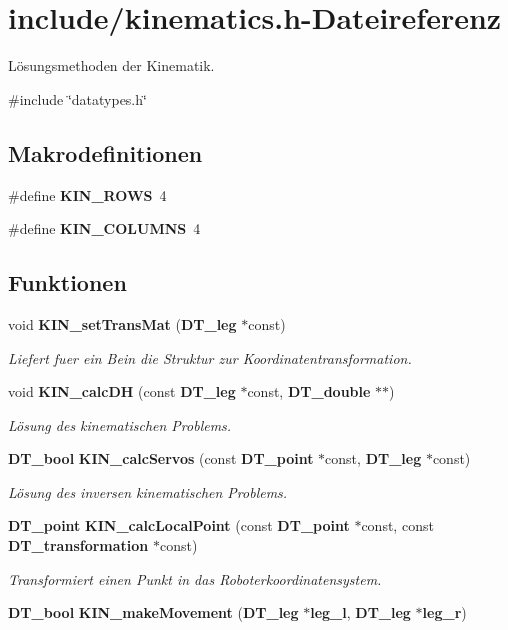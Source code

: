 \section{include/kinematics.h-\/Dateireferenz}
\label{kinematics_8h}


Lösungsmethoden der Kinematik.  


{\ttfamily \#include \char`\"{}datatypes.h\char`\"{}}\par
\subsection*{Makrodefinitionen}
\begin{DoxyCompactItemize}
\item 
\#define {\bf KIN\_\-ROWS}~4
\item 
\#define {\bf KIN\_\-COLUMNS}~4
\end{DoxyCompactItemize}
\subsection*{Funktionen}
\begin{DoxyCompactItemize}
\item 
void {\bf KIN\_\-setTransMat} ({\bf DT\_\-leg} $\ast$const)
\begin{DoxyCompactList}\small\item\em Liefert fuer ein Bein die Struktur zur Koordinatentransformation. \item\end{DoxyCompactList}\item 
void {\bf KIN\_\-calcDH} (const {\bf DT\_\-leg} $\ast$const, {\bf DT\_\-double} $\ast$$\ast$)
\begin{DoxyCompactList}\small\item\em Lösung des kinematischen Problems. \item\end{DoxyCompactList}\item 
{\bf DT\_\-bool} {\bf KIN\_\-calcServos} (const {\bf DT\_\-point} $\ast$const, {\bf DT\_\-leg} $\ast$const)
\begin{DoxyCompactList}\small\item\em Lösung des inversen kinematischen Problems. \item\end{DoxyCompactList}\item 
{\bf DT\_\-point} {\bf KIN\_\-calcLocalPoint} (const {\bf DT\_\-point} $\ast$const, const {\bf DT\_\-transformation} $\ast$const)
\begin{DoxyCompactList}\small\item\em Transformiert einen Punkt in das Roboterkoordinatensystem. \item\end{DoxyCompactList}\item 
{\bf DT\_\-bool} {\bf KIN\_\-makeMovement} ({\bf DT\_\-leg} $\ast${\bf leg\_\-l}, {\bf DT\_\-leg} $\ast${\bf leg\_\-r})
\end{DoxyCompactItemize}


